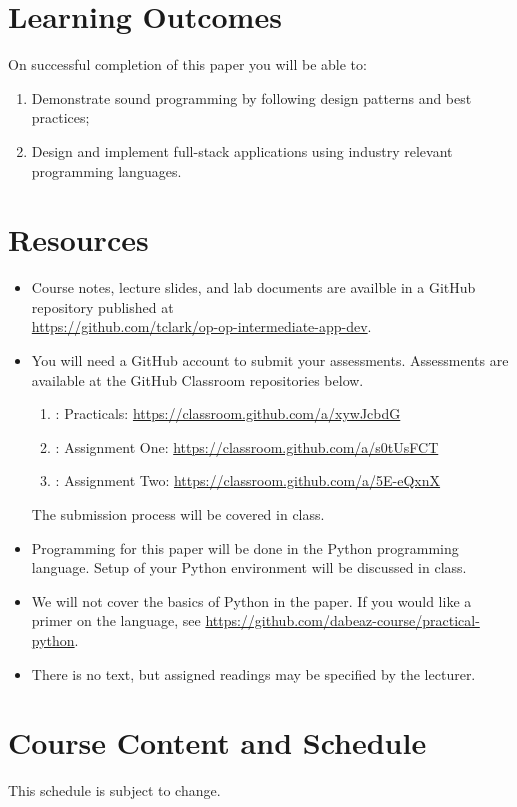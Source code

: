 \documentclass{article}
\begin{document}
\newpage 

\section*{Learning Outcomes}
On successful completion of this paper you will be able to:
\begin{enumerate}
  \item Demonstrate sound programming by following design patterns and best practices;
  \item Design and implement full-stack applications using industry relevant programming languages.
\end{enumerate}

\section*{Resources}
\begin{itemize}
	\item Course notes, lecture slides, and lab documents are availble in a GitHub repository published at \\ \url{https://github.com/tclark/op-op-intermediate-app-dev}.
	\item You will need a GitHub account to submit your assessments. Assessments are available at the GitHub Classroom repositories below.
	    \begin{enumerate}
	    \item: Practicals: \url{https://classroom.github.com/a/xywJcbdG}
	    \item: Assignment One: \url{https://classroom.github.com/a/s0tUsFCT}
	    \item: Assignment Two: \url{https://classroom.github.com/a/5E-eQxnX}
	  \end{enumerate}
	  The submission process will be covered in class.
	\item Programming for this paper will be done in the Python programming language. Setup of your Python environment will be discussed in class. 
	\item We will not cover the basics of Python in the paper. If you would like a primer on the language, see \url{https://github.com/dabeaz-course/practical-python}.
	\item There is no text, but assigned readings may be specified by the lecturer.     
\end{itemize}

\pagebreak

\section*{Course Content and Schedule}
This schedule is subject to change.
\end{document}
